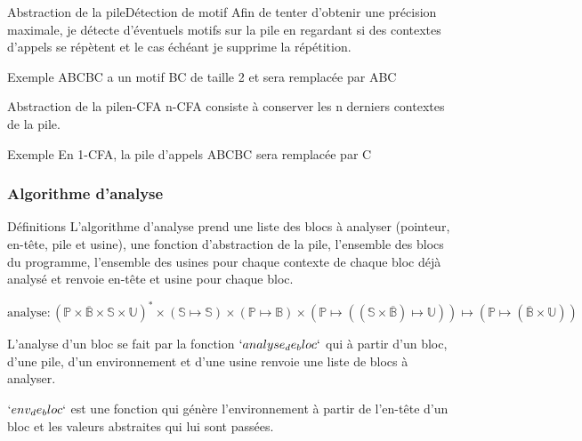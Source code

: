 \documentclass{beamer}
\begin{document}
\begin{frame}{Abstraction de la pile}{Détection de motif}
    Afin de tenter d'obtenir une précision maximale, je détecte d'éventuels motifs sur la pile en regardant si des contextes d'appels se répètent et le cas échéant je supprime la répétition.%

    \begin{exampleblock}{Exemple}
        ABCBC a un motif BC de taille 2 et sera remplacée par ABC
    \end{exampleblock}
\end{frame}

\begin{frame}{Abstraction de la pile}{n-CFA}
    n-CFA consiste à conserver les n derniers contextes de la pile.%

    \begin{exampleblock}{Exemple}
        En 1-CFA, la pile d'appels ABCBC sera remplacée par C
    \end{exampleblock}
\end{frame}

\subsubsection{Algorithme d'analyse}

\begin{frame}{Définitions}
    L'algorithme d'analyse prend une liste des blocs à analyser (pointeur, en-tête, pile et usine), une fonction d'abstraction de la pile, l'ensemble des blocs du programme, l'ensemble des usines pour chaque contexte de chaque bloc déjà analysé et renvoie en-tête et usine pour chaque bloc.

    $\text{analyse} : (\mathbb{P} \times \overline{\mathbb{B}} \times \mathbb{S} \times \mathbb{U})^{*} \times (\mathbb{S} \mapsto \mathbb{S}) \times (\mathbb{P} \mapsto \mathbb{B}) \times (\mathbb{P} \mapsto ((\mathbb{S} \times \overline{\mathbb{B}}) \mapsto \mathbb{U})) \mapsto (\mathbb{P} \mapsto (\overline{\mathbb{B}} \times \mathbb{U}))$

    L'analyse d'un bloc se fait par la fonction $`analyse_de_bloc`$ qui à partir d'un bloc, d'une pile, d'un environnement et d'une usine renvoie une liste de blocs à analyser.

    $`env_de_bloc`$ est une fonction qui génère l'environnement à partir de l'en-tête d'un bloc et les valeurs abstraites qui lui sont passées.
\end{frame}
\end{document}
